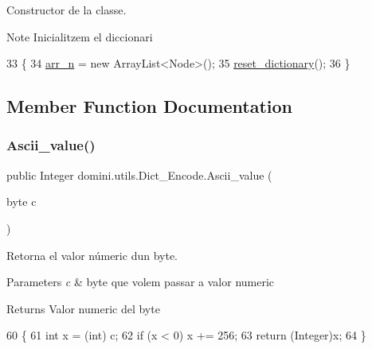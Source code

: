 Constructor de la classe. 

\begin{DoxyNote}{Note}
Inicialitzem el diccionari 
\end{DoxyNote}

\begin{DoxyCode}
33                          \{
34         \hyperlink{classdomini_1_1utils_1_1Dict__Encode_abc506ae01222e16d9b6581efbdad1a97}{arr\_n} = \textcolor{keyword}{new} ArrayList<Node>();
35         \hyperlink{classdomini_1_1utils_1_1Dict__Encode_a6c3016286b3bb242d12799f8e7ebb585}{reset\_dictionary}();
36     \}
\end{DoxyCode}


\subsection{Member Function Documentation}
\mbox{\label{classdomini_1_1utils_1_1Dict__Encode_a12e23ecdd9b0078cb6e56c01126248b9}} 
\subsubsection{\texorpdfstring{Ascii\+\_\+value()}{Ascii\_value()}}
{\footnotesize\ttfamily public Integer domini.\+utils.\+Dict\+\_\+\+Encode.\+Ascii\+\_\+value (\begin{DoxyParamCaption}\item[{byte}]{c }\end{DoxyParamCaption})\hspace{0.3cm}{\ttfamily [inline]}}



Retorna el valor númeric d\textquotesingle{}un byte. 


\begin{DoxyParams}{Parameters}
{\em c} & byte que volem passar a valor numeric \\
\hline
\end{DoxyParams}
\begin{DoxyReturn}{Returns}
Valor numeric del byte 
\end{DoxyReturn}

\begin{DoxyCode}
60                                        \{
61         \textcolor{keywordtype}{int} x = (int) c;
62         \textcolor{keywordflow}{if} (x < 0) x += 256;
63         \textcolor{keywordflow}{return} (Integer)x;
64     \}
\end{DoxyCode}
\mbox{\label{classdomini_1_1utils_1_1Dict__Encode_a21a05b62b848a7ab9fbdf49a3a6e7edf}} 
